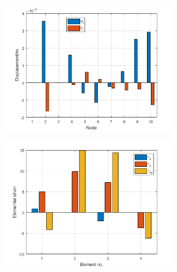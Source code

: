 \documentclass[11pt]{article}
\begin{document}
\begin{figure}[H]
    \centering
    \begin{subfigure}{.5\textwidth}
        \centering
        \includegraphics[width=\linewidth]{img/fig1}
        \caption{}
    \end{subfigure}%
    \begin{subfigure}{.5\textwidth}
        \centering
        \includegraphics[width=\linewidth]{img/fig2}
        \caption{}
    \end{subfigure}
    \caption{}
    \label{fig:base}
\end{figure}
\end{document}
